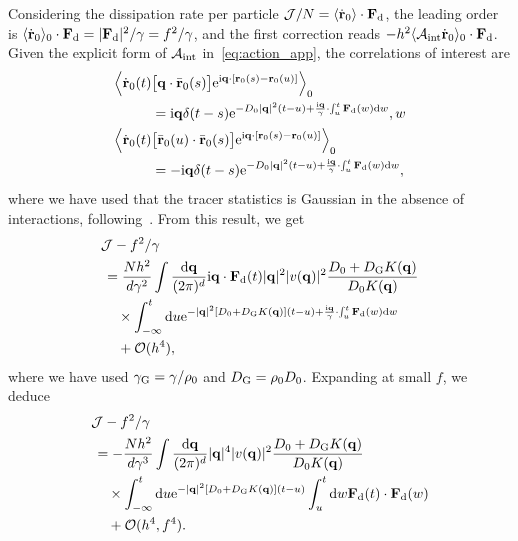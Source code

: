 \documentclass[superscriptaddress, twocolumn, prx, longbibliography, nofootinbib]{revtex4-1}
\begin{document}
Considering the dissipation rate per particle ${\cal J}/N=\langle\dot{\bf r}_0\rangle\cdot{\bf F}_{\rm d}$, the leading order is $\langle\dot{\bf r}_0\rangle_0 \cdot {\bf F}_{\rm d} = |{\bf F}_{\rm d}|^2/\gamma = f^2/\gamma$, and the first correction reads $ - h^2 \langle{\cal A}_{\rm int}\dot{\bf r}_0\rangle_0 \cdot {\bf F}_{\rm d} $. Given the explicit form of ${\cal A}_{\rm int}$ in~\eqref{eq:action_app}, the correlations of interest are
\begin{equation}
	\begin{aligned}
		\Big\langle\dot{\bf r}_0(t) &\big[{\bf q}\cdot\bar{\bf r}_0(s)\big] {\rm e}^{{\rm i}{\bf q}\cdot[{\bf r}_0(s)-{\bf r}_0(u)]}\Big\rangle_0
		\\
		&= {\rm i}{\bf q}\delta(t-s){\rm e}^{ - D_0|{\bf q}|^2(t-u) + \frac{{\rm i}{\bf q}}{\gamma}\cdot\int_u^t {\bf F}_{\rm d}(w) {\rm d}w} ,w
		\\
		\Big\langle\dot{\bf r}_0(t) &\big[\bar{\bf r}_0(u)\cdot\bar{\bf r}_0(s)\big] {\rm e}^{{\rm i}{\bf q}\cdot[{\bf r}_0(s)-{\bf r}_0(u)]}\Big\rangle_0
		\\
		&= -{\rm i}{\bf q}\delta(t-s){\rm e}^{ - D_0|{\bf q}|^2(t-u) + \frac{{\rm i}{\bf q}}{\gamma}\cdot\int_u^t {\bf F}_{\rm d}(w) {\rm d}w} ,
	\end{aligned}
\end{equation}
where we have used that the tracer statistics is Gaussian in the absence of interactions, following~\cite{Demery2011, Demery2014}. From this result, we get
\begin{equation}
	\begin{aligned}
		&{\cal J} - f^2/\gamma
		\\
		&\,= \frac{Nh^2}{d\gamma^2} \int \frac{{\rm d}{\bf q}}{(2\pi)^d} {\rm i}{\bf q}\cdot{\bf F}_{\rm d}(t) |{\bf q}|^2 |v({\bf q})|^2 \frac{D_0+D_{\rm G}K({\bf q})}{D_0K({\bf q})}
		\\
		&\,\quad\times \int_{-\infty}^t {\rm d}u {\rm e}^{-|{\bf q}|^2 [D_0+D_{\rm G} K({\bf q})](t-u) + \frac{{\rm i}{\bf q}}{\gamma}\cdot\int_u^t{\bf F}_{\rm d}(w){\rm d}w}
		\\
		&\,\quad + {\cal O}(h^4) ,
	\end{aligned}
\end{equation}
where we have used $\gamma_{\rm G}=\gamma/\rho_0$ and $D_{\rm G}=\rho_0D_0$. Expanding at small $f$, we deduce
\begin{equation}\label{eq:diss}
	\begin{aligned}
		&{\cal J} - f^2/\gamma
		\\
		&\,= - \frac{Nh^2}{d\gamma^3} \int \frac{{\rm d}{\bf q}}{(2\pi)^d} |{\bf q}|^4 |v({\bf q})|^2 \frac{D_0+D_{\rm G}K({\bf q})}{D_0K({\bf q})}
		\\
		&\,\quad\times \int_{-\infty}^t {\rm d}u {\rm e}^{-|{\bf q}|^2 [D_0+D_{\rm G} K({\bf q})](t-u)} \int_u^t{\rm d}w{\bf F}_{\rm d}(t)\cdot{\bf F}_{\rm d}(w)
		\\
		&\,\quad + {\cal O}(h^4,f^4) .
	\end{aligned}
\end{equation}
\end{document}
